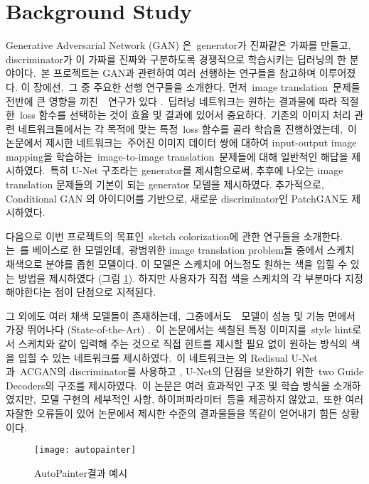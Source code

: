 \section{Background Study}


Generative Adversarial Network (GAN) \cite{Goodfellow2014}은 generator가 진짜같은 가짜를 만들고, discriminator가 이 가짜를 진짜와 구분하도록 경쟁적으로 학습시키는 딥러닝의 한 분야이다. 본 프로젝트는 GAN과 관련하여 여러 선행하는 연구들을 참고하며 이루어졌다.
이 장에선, 그 중 주요한 선행 연구들을 소개한다.
먼저 image translation 문제들 전반에 큰 영향을 끼친 \pixpix~연구가 있다 \cite{phillip2017}. 딥러닝 네트워크는 원하는 결과물에 따라 적절한 loss 함수를 선택하는 것이 효율 및 결과에 있어서 중요하다. 기존의 이미지 처리 관련 네트워크들에서는 각 목적에 맞는 특정 loss 함수를 골라 학습을 진행하였는데, 이 논문에서 제시한 네트워크는 주어진 이미지 데이터 쌍에 대하여 input-output image mapping을 학습하는 image-to-image translation 문제들에 대해 일반적인 해답을 제시하였다. 특히 U-Net 구조라는 generator를 제시함으로써, 추후에 나오는 image translation 문제들의 기본이 되는 generator 모델을 제시하였다.
추가적으로, Conditional GAN \cite{Mirza2014CGAN}의 아이디어를 기반으로, 새로운 discriminator인 PatchGAN도 제시하였다.

다음으로 이번 프로젝트의 목표인 sketch colorization에 관한 연구들을 소개한다.
\autopaint 는 \pixpix 를 베이스로 한 모델인데, 광범위한 image translation problem들 중에서 스케치 채색으로 분야를 좁힌 모델이다.
이 모델은 스케치에 어느정도 원하는 색을 입힐 수 있는 방법을 제시하였다 (그림 \ref{fig:autopainter}).
하지만 사용자가 직접 색을 스케치의 각 부분마다 지정해야한다는 점이 단점으로 지적된다.
 
그 외에도 여러 채색 모델들이 존재하는데, 그중에서도 \stylepaint~모델이 성능 및 기능 면에서 가장 뛰어나다 (State-of-the-Art) \cite{Zhang2017}. 이 논문에서는 색칠된 특정 이미지를 style hint로서 스케치와 같이 입력해 주는 것으로 직접 힌트를 제시할 필요 없이 원하는 방식의 색을 입힐 수 있는 네트워크를 제시하였다. 이 네트워크는 \pixpix 의 Redisual U-Net과 ACGAN의 discriminator를 사용하고 \cite{Odena2017}, U-Net의 단점을 보완하기 위한 two Guide Decoders의 구조를 제시하였다. 이 논문은 여러 효과적인 구조 및 학습 방식을 소개하였지만, 모델 구현의 세부적인 사항, 하이퍼파라미터 등을 제공하지 않았고, 또한 여러 자잘한 오류들이 있어 논문에서 제시한 수준의 결과물들을 똑같이 얻어내기 힘든 상황이다.

\begin{figure}[t]
	\centering
	\texttt{[image: autopainter]}
	\caption{AutoPainter결과 예시}
	\label{fig:autopainter}
\end{figure}